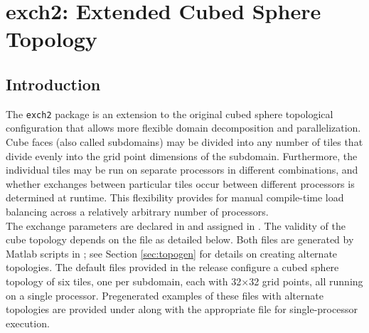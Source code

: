 


\section{exch2: Extended Cubed Sphere \mbox{Topology}}
\label{sec:exch2}


\subsection{Introduction}

The \texttt{exch2} package is an extension to the original cubed
sphere topological configuration that allows more flexible domain
decomposition and parallelization.  Cube faces (also called
subdomains) may be divided into any number of tiles that divide evenly
into the grid point dimensions of the subdomain.  Furthermore, the
individual tiles may be run on separate processors in different
combinations, and whether exchanges between particular tiles occur
between different processors is determined at runtime.  This
flexibility provides for manual compile-time load balancing across a
relatively arbitrary number of processors. \\

The exchange parameters are declared in
and assigned in
. The
validity of the cube topology depends on the  file as
detailed below.  Both files are generated by Matlab scripts in
; see Section
\ref{sec:topogen} 
for details on creating alternate topologies.  The default files
provided in the release configure a cubed sphere topology of six
tiles, one per subdomain, each with 32$\times$32 grid points, all
running on a single processor.  Pregenerated examples of these files
with alternate topologies are provided under
 along with the appropriate 
file for single-processor execution.

